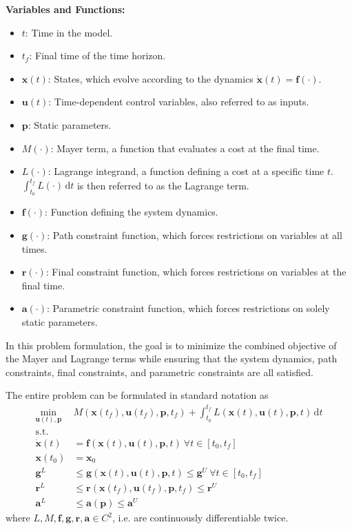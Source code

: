 \documentclass[12pt]{article}
\newcommand{\dd}{\mathrm{d}}
\renewcommand{\v}{\bm}
\begin{document}
\noindent
\textbf{Variables and Functions:}
\begin{itemize}
	\item $t$: Time in the model.
	\item $t_f$: Final time of the time horizon.
	\item $\v{x}(t)$: States, which evolve according to the dynamics
	      $\dot{\v{x}}(t) = \v{f}(\cdot)$.
	\item $\v{u}(t)$: Time-dependent control variables, also referred to as
	      inputs.
	\item $\v{p}$: Static parameters.
	\item $M(\cdot)$: Mayer term, a function that evaluates a cost at the
	      final time.
	\item $L(\cdot)$: Lagrange integrand, a function defining a cost at a
	      specific time $t$. $\int_{t_0}^{t_f} L(\cdot) \, \dd t$ is then referred to as
	      the Lagrange term.
	\item $\v{f}(\cdot)$: Function defining the system dynamics.
	\item $\v{g}(\cdot)$: Path constraint function, which forces
	      restrictions on variables at all times.
	\item $\v{r}(\cdot)$: Final constraint function, which forces
	      restrictions on variables at the final time.
	\item $\v{a}(\cdot)$: Parametric constraint function, which forces
	      restrictions on solely static parameters.
\end{itemize}

In this problem formulation, the goal is to minimize the combined objective of
the Mayer and Lagrange terms while ensuring that the system dynamics, path
constraints, final constraints, and parametric constraints are all satisfied.

The entire problem can be formulated in standard notation as
\begin{align*}
	\min_{\v{u}(t), \v{p}} ~ & M(\v{x}(t_f), \v{u}(t_f),
	\v{p}, t_f) + \int_{t_0}^{t_f} L(\v{x}(t), \v{u}(t), \v{p}, t)
	\, \mathrm{d}t
	\\
	\text{s.t.}              &
	\\
	\dot{\v{x}}(t)           & = \v{f}(\v{x}(t), \v{u}(t), \v{p},
	t)\
	\forall t \in [t_0, t_f]
	\\
	\v{x}(t_0)               & = \v{x}_0
	\\
	\v{g}^{L}                & \leq \v{g}(\v{x}(t), \v{u}(t),
	\v{p}, t)
	\leq \v{g}^{U}\ \forall t \in [t_0, t_f]
	\\
	\v{r}^{L}                & \leq \v{r}(\v{x}(t_f), \v{u}(t_f),
	\v{p},
	t_f) \leq \v{r}^{U}
	\\
	\v{a}^{L}                & \leq \v{a}(\v{p}) \leq \v{a}^{U}
\end{align*}
where $L, M, \v{f}, \v{g}, \v{r}, \v{a} \in C^2$, i.e. are continuously
differentiable twice.
\end{document}
